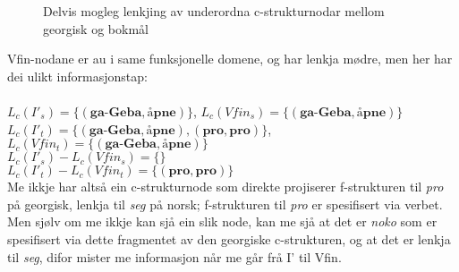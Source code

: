 \documentclass[11pt,a4paper,oneside,draft]{book}
\begin{document}
\begin{figure}[htp]
\centering
{}


\caption{Delvis mogleg lenkjing av underordna c-strukturnodar mellom georgisk og bokmål}
 \label{fig:ikkjesub2}
\end{figure}
 
Vfin-nodane er au i same funksjonelle domene, og har lenkja mødre, men
her har dei ulikt informasjonstap:\\
\\$L_c(I'_s)=\{(\textbf{ga-Geba},\textbf{åpne})\}$,
$L_c(Vfin_s)=\{(\textbf{ga-Geba},\textbf{åpne})\}$
\\$L_c(I'_t)=\{(\textbf{ga-Geba},\textbf{åpne}),(\textbf{pro},\textbf{pro})\}$,
$L_c(Vfin_t)=\{(\textbf{ga-Geba},\textbf{åpne})\}$
\\$L_c(I'_s)-L_c(Vfin_s)=\{\}$
\\$L_c(I'_t)-L_c(Vfin_t)=\{(\textbf{pro},\textbf{pro})\}$\\

Me ikkje har altså ein c-strukturnode som direkte projiserer
f-strukturen til \emph{pro} på georgisk, lenkja til \emph{seg} på norsk;
f-strukturen til \emph{pro} er spesifisert via verbet. Men sjølv om me
ikkje kan sjå ein slik node, kan me sjå at det er \emph{noko} som er
spesifisert via dette fragmentet av den georgiske c-strukturen, og at
det er lenkja til \emph{seg}, difor mister me informasjon når me går frå I'
til Vfin.
\end{document}
